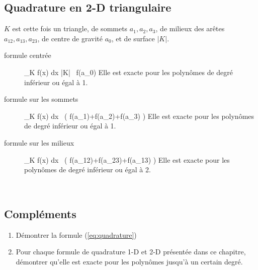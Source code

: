 \subsection{Quadrature en 2-D triangulaire}
\noindent
%
%
$K$ est cette fois un triangle, de sommets $a_1,a_2,a_3$, de milieux des ar\^etes $a_{12}, a_{13}, a_{23}$, de centre de gravit\'e $a_0$, et de surface $|K|$.
%
\begin{description}
\item[formule centr\'ee]
\be
\int_K f(x)\; dx \simeq |K| \, f(a_0)
\ee
Elle est exacte pour les polyn\^omes de degr\'e inf\'erieur ou \'egal \`a 1.\\
%
\item[formule sur les sommets]
\be
\int_K f(x)\; dx \simeq {} \, \left( f(a_1)+f(a_2)+f(a_3) \right)
\ee
Elle est exacte pour les polyn\^omes de degr\'e inf\'erieur ou \'egal \`a 1.\\
%
\item[formule sur les milieux]
\be
\int_K f(x)\; dx \simeq {} \, \left( f(a_{12})+f(a_{23})+f(a_{13}) \right)
\ee
Elle est exacte pour les polyn\^omes de degr\'e inf\'erieur ou \'egal \`a 2.
\end{description}
%
%
\small
~\vspace*{3cm}\\
\subsection*{Compl\'ements}
%
\begin{enumerate}
\item D\'emontrer la formule (\ref{eq:quadrature})
\item Pour chaque formule de quadrature 1-D et 2-D pr\'esent\'ee dans ce chapitre, d\'emontrer qu'elle est exacte pour les polyn\^omes jusqu'\`a un certain degr\'e.
\end{enumerate}

%
\normalsize


